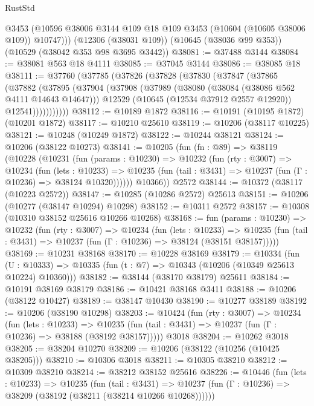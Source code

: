 \begin{lexlean}{RustStd}
\begin{coremodule}
        @3453
        (@10596 @38006 @3144 @109 @18 @109 @3453 (@10604 (@10605 @38006 @109)) @10747)))
    (@12306 (@38031 @109))
    (@10645 (@38036 @99 @353))
    (@10529 (@38042 @353 @98 @3695 @3442))
@38081 := @37488 @3144
@38084 := @38081 @563 @18 @4111
@38085 := @37045 @3144
@38086 := @38085 @18
@38111 := @37760
    (@37785
      (@37826
        (@37828
          (@37830
            (@37847
              (@37865
                (@37882
                  (@37895
                    (@37904
                      (@37908
                        (@37989
                          (@38080 (@38084 (@38086 @562 @4111 @14643 @14647)))
                          @12529
                          (@10645 (@12534 @37912 @2557 @12920))
                          @12541)))))))))))
@38112 := @10189 @1872
@38116 := @10191 (@10195 @1872) (@10201 @1872)
@38117 := @10210 @25610
@38119 := @10206 (@38117 @10225)
@38121 := @10248 (@10249 @1872)
@38122 := @10244 @38121
@38124 := @10206 (@38122 @10273)
@38141 := @10205
    (fun (fn : @89) =>
    @38119
      (@10228
        (@10231
          (fun (params : @10230) =>
          @10232
            (fun (rty : @3007) =>
            @10234
              (fun (lets : @10233) =>
              @10235 (fun (tail : @3431) => @10237 (fun (Γ : @10236) => @38124 @10320))))))
        @10366))
    @2572
@38144 := @10372 (@38117 (@10223 @2572))
@38147 := @10285 (@10286 @2572) @25613
@38151 := @10206 (@10277 (@38147 @10294) @10298)
@38152 := @10311 @2572
@38157 := @10308 (@10310 @38152 @25616 @10266 @10268)
@38168 := fun (params : @10230) =>
  @10232
    (fun (rty : @3007) =>
    @10234
      (fun (lets : @10233) =>
      @10235 (fun (tail : @3431) => @10237 (fun (Γ : @10236) => @38124 (@38151 @38157)))))
@38169 := @10231 @38168
@38170 := @10228 @38169
@38179 := @10334
    (fun (U : @10333) => @10335 (fun (t : @7) => @10343 (@10206 (@10349 @25613 @10224) @10360)))
@38182 := @38144 (@38170 @38179) @25611
@38184 := @10191 @38169 @38179
@38186 := @10421 @38168 @3411
@38188 := @10206 (@38122 @10427)
@38189 := @38147 @10430
@38190 := @10277 @38189
@38192 := @10206 (@38190 @10298)
@38203 := @10424
    (fun (rty : @3007) =>
    @10234
      (fun (lets : @10233) =>
      @10235 (fun (tail : @3431) => @10237 (fun (Γ : @10236) => @38188 (@38192 @38157)))))
    @3018
@38204 := @10262 @3018
@38205 := @38204 @10270
@38209 := @10206 (@38122 (@10256 (@10425 @38205)))
@38210 := @10306 @3018
@38211 := @10305 @38210
@38212 := @10309 @38210
@38214 := @38212 @38152 @25616
@38226 := @10446
    (fun (lets : @10233) =>
    @10235
      (fun (tail : @3431) =>
      @10237 (fun (Γ : @10236) => @38209 (@38192 (@38211 (@38214 @10266 @10268))))))

\end{coremodule}
\end{lexlean}

